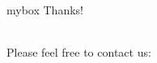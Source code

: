 \documentclass{beamer}
\begin{document}
\begin{frame}
\begin{center}
    \begin{minipage}{1\textwidth}
		\begin{beamercolorbox}[wd=0.70\textwidth, rounded=true, shadow=true]{mybox}
			\LARGE \centering Thanks!
		\end{beamercolorbox}
    \end{minipage}
    \\[20pt]
    \Large Please feel free to contact us:
    \\[10pt]
\end{center}

\end{frame}
\end{document}
